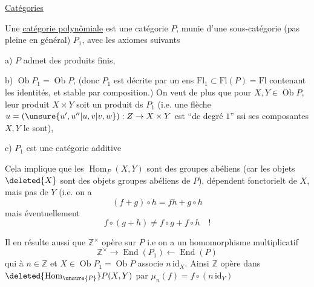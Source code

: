 \uline{Catégories} \uline{}

Une \uline{catégorie polynômiale} est une catégorie $P$,
munie d'une sous-catégorie (pas pleine en général)
$P_1$, avec les axiomes suivants

a) $P$ admet des produits finis, 

b) $\operatorname{Ob}P_1=\operatorname{Ob}P$,  (donc $P_1$ est décrite
par un ens $\mathrm{Fl}_1\subset\mathrm{Fl}(P)=\mathrm{Fl}$ contenant les identités,
et stable par composition.) On veut de plus que
 pour $X,Y\in\operatorname{Ob}P$,
leur produit $X\times Y$ soit un produit ds $P_1$
(i.e. une flèche $u=(\unsure{u',u''|u,v|v,w}) : Z\to X\times Y$ est
``de degré $1$'' ssi ses composantes $X,Y$ le sont),

c) $P_1$ est une catégorie additive

Cela implique que  les $\operatorname{Hom}_P(X,Y)$
sont des groupes abéliens (car les objets $\deleted{X}$ sont
des objets groupes abéliens de $P$), dépendent
fonctorielt de $X$, mais pas de $Y$
(i.e. on a
\[
\boxed{(f+g)\circ h=fh+g\circ h}
\]
mais  éventuellement
\[
f\circ(g+h)\ne f\circ g+f\circ h\quad !
\]

Il en résulte aussi que $\mathbb Z^\times$ opère sur $P$
i.e on a un homomorphisme multiplicatif
\[
\mathbb Z^\times\longrightarrow\operatorname{End}(P_1)\longleftarrow\operatorname{End}(P)
\]
qui à $n\in\mathbb Z$ et $X\in\operatorname{Ob}P_1=\operatorname{Ob}P$ associe $n\,\mathrm{id}_X$.
Ainsi $\mathbb Z$ opère dans $\deleted{\operatorname{Hom}_{\unsure{P}}}P(X,Y)$ par
$\mu_n(f)=f\circ(n\,\mathrm{id}_Y)$
